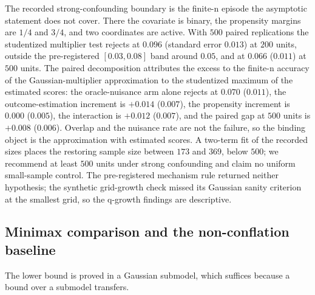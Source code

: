 The recorded strong-confounding boundary is the finite-n episode the asymptotic statement does not cover. There the covariate is binary, the propensity margins are $1/4$ and $3/4$, and two coordinates are active. With $500$ paired replications the studentized multiplier test rejects at $0.096$ (standard error $0.013$) at $200$ units, outside the pre-registered $[0.03,0.08]$ band around $0.05$, and at $0.066$ ($0.011$) at $500$ units. The paired decomposition attributes the excess to the finite-n accuracy of the Gaussian-multiplier approximation to the studentized maximum of the estimated scores: the oracle-nuisance arm alone rejects at $0.070$ ($0.011$), the outcome-estimation increment is $+0.014$ ($0.007$), the propensity increment is $0.000$ ($0.005$), the interaction is $+0.012$ ($0.007$), and the paired gap at $500$ units is $+0.008$ ($0.006$). Overlap and the nuisance rate are not the failure, so the binding object is the approximation with estimated scores. A two-term fit of the recorded sizes places the restoring sample size between $173$ and $369$, below $500$; we recommend at least $500$ units under strong confounding and claim no uniform small-sample control. The pre-registered mechanism rule returned neither hypothesis; the synthetic grid-growth check missed its Gaussian sanity criterion at the smallest grid, so the q-growth findings are descriptive.
\subsection{Minimax comparison and the non-conflation baseline}
\label{subsec:minimax}

The lower bound is proved in a Gaussian submodel, which suffices because a bound over a submodel transfers.

